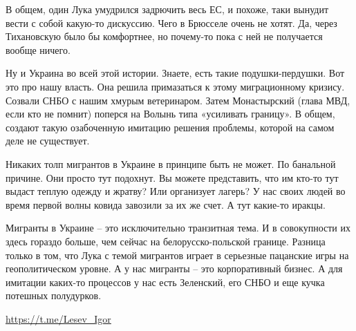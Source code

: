 В общем, один Лука умудрился задрючить весь ЕС, и похоже, таки вынудит вести с
собой какую-то дискуссию. Чего в Брюсселе очень не хотят. Да, через Тихановскую
было бы комфортнее, но почему-то пока с ней не получается вообще ничего.

Ну и Украина во всей этой истории. Знаете, есть такие подушки-пердушки. Вот это
про нашу власть. Она решила примазаться к этому миграционному кризису. Созвали
СНБО с нашим хмурым ветеринаром. Затем Монастырский (глава МВД, если кто не
помнит) поперся на Волынь типа «усиливать границу». В общем, создают такую
озабоченную имитацию решения проблемы, которой на самом деле не существует.

Никаких толп мигрантов в Украине в принципе быть не может. По банальной
причине. Они просто тут подохнут. Вы можете представить, что им кто-то тут
выдаст теплую одежду и жратву? Или организует лагерь? У нас своих людей во
время первой волны ковида завозили за их же счет. А тут какие-то иракцы.

Мигранты в Украине – это исключительно транзитная тема. И в совокупности их
здесь гораздо больше, чем сейчас на белорусско-польской границе. Разница только
в том, что Лука с темой мигрантов играет в серьезные пацанские игры на
геополитическом уровне. А у нас мигранты – это корпоративный бизнес. А для
имитации каких-то процессов у нас есть Зеленский, его СНБО и еще кучка потешных
полудурков.

\url{https://t.me/Lesev_Igor}

